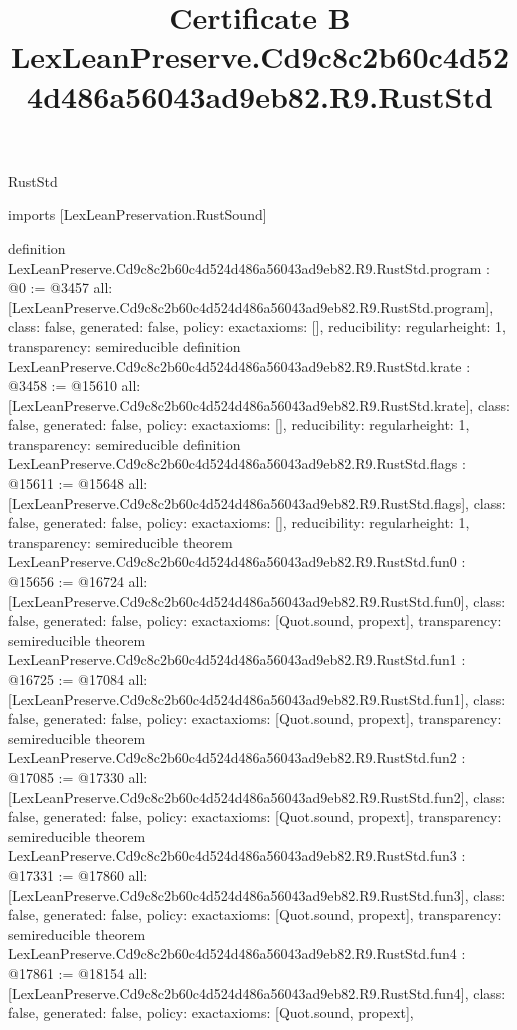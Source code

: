 \begin{lexlean}{RustStd}
\title{Certificate B LexLeanPreserve.Cd9c8c2b60c4d524d486a56043ad9eb82.R9.RustStd}
\begin{coremodule}
imports [LexLeanPreservation.RustSound]

definition LexLeanPreserve.Cd9c8c2b60c4d524d486a56043ad9eb82.R9.RustStd.program : @0 := @3457 {
  all: [LexLeanPreserve.Cd9c8c2b60c4d524d486a56043ad9eb82.R9.RustStd.program],
  class: false,
  generated: false,
  policy: exact{axioms: []},
  reducibility: regular{height: 1},
  transparency: semireducible
}
definition LexLeanPreserve.Cd9c8c2b60c4d524d486a56043ad9eb82.R9.RustStd.krate : @3458 := @15610 {
  all: [LexLeanPreserve.Cd9c8c2b60c4d524d486a56043ad9eb82.R9.RustStd.krate],
  class: false,
  generated: false,
  policy: exact{axioms: []},
  reducibility: regular{height: 1},
  transparency: semireducible
}
definition LexLeanPreserve.Cd9c8c2b60c4d524d486a56043ad9eb82.R9.RustStd.flags : @15611 := @15648 {
  all: [LexLeanPreserve.Cd9c8c2b60c4d524d486a56043ad9eb82.R9.RustStd.flags],
  class: false,
  generated: false,
  policy: exact{axioms: []},
  reducibility: regular{height: 1},
  transparency: semireducible
}
theorem LexLeanPreserve.Cd9c8c2b60c4d524d486a56043ad9eb82.R9.RustStd.fun0 : @15656 := @16724 {
  all: [LexLeanPreserve.Cd9c8c2b60c4d524d486a56043ad9eb82.R9.RustStd.fun0],
  class: false,
  generated: false,
  policy: exact{axioms: [Quot.sound, propext]},
  transparency: semireducible
}
theorem LexLeanPreserve.Cd9c8c2b60c4d524d486a56043ad9eb82.R9.RustStd.fun1 : @16725 := @17084 {
  all: [LexLeanPreserve.Cd9c8c2b60c4d524d486a56043ad9eb82.R9.RustStd.fun1],
  class: false,
  generated: false,
  policy: exact{axioms: [Quot.sound, propext]},
  transparency: semireducible
}
theorem LexLeanPreserve.Cd9c8c2b60c4d524d486a56043ad9eb82.R9.RustStd.fun2 : @17085 := @17330 {
  all: [LexLeanPreserve.Cd9c8c2b60c4d524d486a56043ad9eb82.R9.RustStd.fun2],
  class: false,
  generated: false,
  policy: exact{axioms: [Quot.sound, propext]},
  transparency: semireducible
}
theorem LexLeanPreserve.Cd9c8c2b60c4d524d486a56043ad9eb82.R9.RustStd.fun3 : @17331 := @17860 {
  all: [LexLeanPreserve.Cd9c8c2b60c4d524d486a56043ad9eb82.R9.RustStd.fun3],
  class: false,
  generated: false,
  policy: exact{axioms: [Quot.sound, propext]},
  transparency: semireducible
}
theorem LexLeanPreserve.Cd9c8c2b60c4d524d486a56043ad9eb82.R9.RustStd.fun4 : @17861 := @18154 {
  all: [LexLeanPreserve.Cd9c8c2b60c4d524d486a56043ad9eb82.R9.RustStd.fun4],
  class: false,
  generated: false,
  policy: exact{axioms: [Quot.sound, propext]},
}
\end{coremodule}
\end{lexlean}
